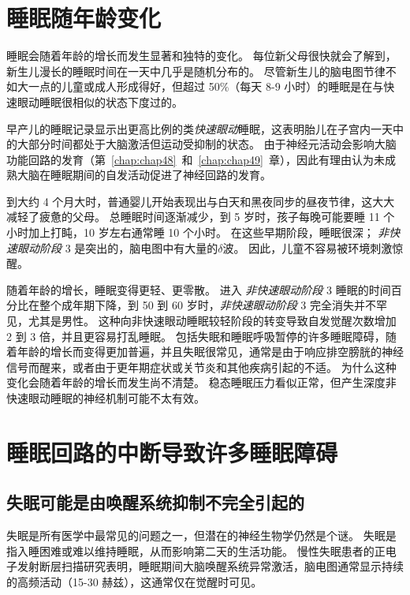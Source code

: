 \section{睡眠随年龄变化}

睡眠会随着年龄的增长而发生显著和独特的变化。
每位新父母很快就会了解到，新生儿漫长的睡眠时间在一天中几乎是随机分布的。
尽管新生儿的脑电图节律不如大一点的儿童或成人形成得好，但超过 50\%（每天 8-9 小时）的睡眠是在与快速眼动睡眠很相似的状态下度过的。


早产儿的睡眠记录显示出更高比例的类\textit{快速眼动}睡眠，这表明胎儿在子宫内一天中的大部分时间都处于大脑激活但运动受抑制的状态。
由于神经元活动会影响大脑功能回路的发育（第~\ref{chap:chap48}~和~\ref{chap:chap49}~章），因此有理由认为未成熟大脑在睡眠期间的自发活动促进了神经回路的发育。


到大约 4 个月大时，普通婴儿开始表现出与白天和黑夜同步的昼夜节律，这大大减轻了疲惫的父母。
总睡眠时间逐渐减少，到 5 岁时，孩子每晚可能要睡 11 个小时加上打盹，10 岁左右通常睡 10 个小时。
在这些早期阶段，睡眠很深；
\textit{非快速眼动阶段} 3 是突出的，脑电图中有大量的$ \delta $波。
因此，儿童不容易被环境刺激惊醒。


随着年龄的增长，睡眠变得更轻、更零散。
进入 \textit{非快速眼动阶段} 3 睡眠的时间百分比在整个成年期下降，到 50 到 60 岁时，\textit{非快速眼动阶段} 3 完全消失并不罕见，尤其是男性。
这种向非快速眼动睡眠较轻阶段的转变导致自发觉醒次数增加 2 到 3 倍，并且更容易打乱睡眠。
包括失眠和睡眠呼吸暂停的许多睡眠障碍，随着年龄的增长而变得更加普遍，并且失眠很常见，通常是由于响应排空膀胱的神经信号而醒来，或者由于更年期症状或关节炎和其他疾病引起的不适。
为什么这种变化会随着年龄的增长而发生尚不清楚。
稳态睡眠压力看似正常，但产生深度非快速眼动睡眠的神经机制可能不太有效。


\section{睡眠回路的中断导致许多睡眠障碍}

\subsection{失眠可能是由唤醒系统抑制不完全引起的}


失眠是所有医学中最常见的问题之一，但潜在的神经生物学仍然是个谜。
失眠是指入睡困难或难以维持睡眠，从而影响第二天的生活功能。
慢性失眠患者的正电子发射断层扫描研究表明，睡眠期间大脑唤醒系统异常激活，脑电图通常显示持续的高频活动（15-30 赫兹），这通常仅在觉醒时可见。


